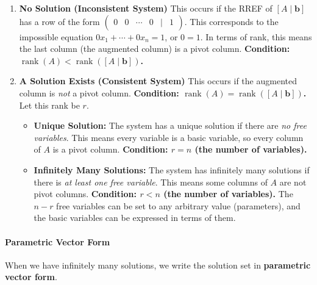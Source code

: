 \documentclass[oneside]{book}
\begin{document}
\begin{enumerate}
    \item \textbf{No Solution (Inconsistent System)}
    This occurs if the RREF of $[A \mid \mathbf{b}]$ has a row of the form $\begin{pmatrix} 0 & 0 & \cdots & 0 & \mid & 1 \end{pmatrix}$.
    This corresponds to the impossible equation $0x_1 + \cdots + 0x_n = 1$, or $0 = 1$.
    In terms of rank, this means the last column (the augmented column) is a pivot column.
    \textbf{Condition: $\operatorname{rank}(A) < \operatorname{rank}([A \mid \mathbf{b}])$.}

    \item \textbf{A Solution Exists (Consistent System)}
    This occurs if the augmented column is \emph{not} a pivot column.
    \textbf{Condition: $\operatorname{rank}(A) = \operatorname{rank}([A \mid \mathbf{b}])$.} Let this rank be $r$.
    \begin{itemize}
        \item \textbf{Unique Solution:} The system has a unique solution if there are \emph{no free variables}. This means every variable is a basic variable, so every column of $A$ is a pivot column.
        \textbf{Condition: $r = n$ (the number of variables).}
        
        \item \textbf{Infinitely Many Solutions:} The system has infinitely many solutions if there is \emph{at least one free variable}. This means some columns of $A$ are not pivot columns.
        \textbf{Condition: $r < n$ (the number of variables).}
        The $n - r$ free variables can be set to any arbitrary value (parameters), and the basic variables can be expressed in terms of them.
    \end{itemize}
\end{enumerate}

\paragraph{Parametric Vector Form}
When we have infinitely many solutions, we write the solution set in \textbf{parametric vector form}.
\end{document}
